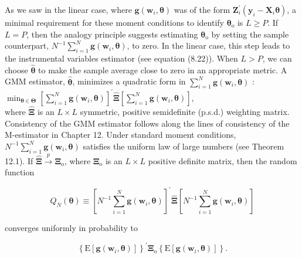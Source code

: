 \documentclass[10pt]{article}
\begin{document}
As we saw in the linear case, where $\mathbf{g}\left(\mathbf{w}_{i}, \boldsymbol{\theta}\right)$ was of the form $\mathbf{Z}_{i}^{\prime}\left(\mathbf{y}_{i}-\mathbf{X}_{i} \boldsymbol{\theta}\right)$, a minimal requirement for these moment conditions to identify $\boldsymbol{\theta}_{\mathrm{o}}$ is $L \geq P$. If $L=P$, then the analogy principle suggests estimating $\boldsymbol{\theta}_{\mathrm{o}}$ by setting the sample counterpart, $N^{-1} \sum_{i=1}^{N} \mathbf{g}\left(\mathbf{w}_{i}, \boldsymbol{\theta}\right)$, to zero. In the linear case, this step leads to the instrumental variables estimator (see equation (8.22)). When $L>P$, we can choose $\hat{\boldsymbol{\theta}}$ to make the sample average close to zero in an appropriate metric. A GMM estimator, $\hat{\boldsymbol{\theta}}$, minimizes a quadratic form in $\sum_{i=1}^{N} \mathbf{g}\left(\mathbf{w}_{i}, \boldsymbol{\theta}\right)$ :\\
$\min _{\boldsymbol{\theta} \in \boldsymbol{\Theta}}\left[\sum_{i=1}^{N} \mathbf{g}\left(\mathbf{w}_{i}, \boldsymbol{\theta}\right)\right]^{\prime} \hat{\boldsymbol{\Xi}}\left[\sum_{i=1}^{N} \mathbf{g}\left(\mathbf{w}_{i}, \boldsymbol{\theta}\right)\right]$,\\
where $\hat{\boldsymbol{\Xi}}$ is an $L \times L$ symmetric, positive semidefinite (p.s.d.) weighting matrix.\\
Consistency of the GMM estimator follows along the lines of consistency of the M-estimator in Chapter 12. Under standard moment conditions, $N^{-1} \sum_{i=1}^{N} \mathbf{g}\left(\mathbf{w}_{i}, \boldsymbol{\theta}\right)$ satisfies the uniform law of large numbers (see Theorem 12.1). If $\hat{\boldsymbol{\Xi}} \xrightarrow{p} \boldsymbol{\Xi}_{\mathrm{o}}$, where $\boldsymbol{\Xi}_{\mathrm{o}}$ is an $L \times L$ positive definite matrix, then the random function


\begin{equation*}
Q_{N}(\boldsymbol{\theta}) \equiv\left[N^{-1} \sum_{i=1}^{N} \mathbf{g}\left(\mathbf{w}_{i}, \boldsymbol{\theta}\right)\right]^{\prime} \hat{\boldsymbol{\Xi}}\left[N^{-1} \sum_{i=1}^{N} \mathbf{g}\left(\mathbf{w}_{i}, \boldsymbol{\theta}\right)\right] \tag{14.3}
\end{equation*}


converges uniformly in probability to


\begin{equation*}
\left\{\mathrm{E}\left[\mathbf{g}\left(\mathbf{w}_{i}, \boldsymbol{\theta}\right)\right]\right\}^{\prime} \boldsymbol{\Xi}_{\mathrm{o}}\left\{\mathrm{E}\left[\mathbf{g}\left(\mathbf{w}_{i}, \boldsymbol{\theta}\right)\right]\right\} . \tag{14.4}
\end{equation*}
\end{document}
